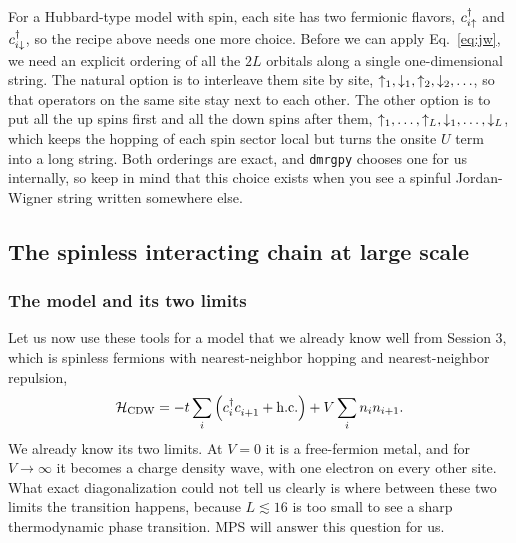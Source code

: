 \documentclass[lecture_notes.tex]{subfiles}
\begin{document}
For a Hubbard-type model with spin, each site has two fermionic flavors, $c^{\dagger}_{i\uparrow}$ and
$c^{\dagger}_{i\downarrow}$, so the recipe above needs one more choice. Before we can apply Eq.~\eqref{eq:jw}, we
need an explicit ordering of all the $2L$ orbitals along a single one-dimensional string. The
natural option is to interleave them site by site, $\uparrow_1,\downarrow_1,\uparrow_2,\downarrow_2,\ldots$, so that
operators on the same site stay next to each other. The other option is to put all the up spins
first and all the down spins after them, $\uparrow_1,\ldots,\uparrow_L,\downarrow_1,\ldots,\downarrow_L$, which keeps the
hopping of each spin sector local but turns the onsite $U$ term into a long string. Both orderings
are exact, and \texttt{dmrgpy} chooses one for us internally, so keep in mind that this choice
exists when you see a spinful Jordan-Wigner string written somewhere else.

\subsection{The spinless interacting chain at large scale}
\label{sec:spinless}

\subsubsection{The model and its two limits}
Let us now use these tools for a model that we already know well from Session 3, which is spinless
fermions with nearest-neighbor hopping and nearest-neighbor repulsion,
\begin{equation}
  \Ham_{\mathrm{CDW}} = -t\sum_i\left(\cre{i}\ann{i+1}+\mathrm{h.c.}\right) + V\sum_i n_in_{i+1}.
  \label{eq:cdw}
\end{equation}
We already know its two limits. At $V=0$ it is a free-fermion metal, and for $V\to\infty$ it
becomes a charge density wave, with one electron on every other site. What exact diagonalization
could not tell us clearly is where between these two limits the transition happens,
because $L\lesssim 16$ is too small to see a sharp thermodynamic phase transition. MPS will answer
this question for us.
\end{document}
